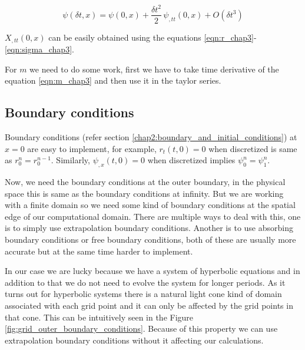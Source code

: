 \begin{equation*}
    \psi(\delta t,x) = \psi(0,x) + \frac{\delta t^2}{2} \, \psi_{,tt}(0,x) + O(\delta t^3)
\end{equation*}

$X_{,tt}(0,x)$ can be easily obtained using the equations \ref{eqn:r_chap3}-\ref{eqn:sigma_chap3}.


For $m$ we need to do some work, first we have to take time derivative of the equation \ref{eqn:m_chap3} and then use it in the taylor series.


\subsection{Boundary conditions}
\label{chap3:boundary_conditinos}

Boundary conditions (refer section \ref{chap2:boundary_and_initial_conditions}) at $x=0$ are easy to implement, for example, $r_t(t,0) = 0$ when discretized is same as $r^{n}_0 = r^{n-1}_0$. Similarly, $\psi_{,x}(t,0) = 0 $ when discretized implies $\psi^{n}_0 = \psi^{n}_1$.

Now, we need the boundary conditions at the outer boundary, in the physical space this is same as the boundary conditions at infinity. But we are working with a finite domain so we need some kind of boundary conditions at the spatial edge of our computational domain. There are multiple ways to deal with this, one is to simply use extrapolation boundary conditions. Another is to use absorbing boundary conditions or free boundary conditions, both of these are usually more accurate but at the same time harder to implement.

In our case we are lucky because we have a system of hyperbolic equations and in addition to that we do not need to evolve the system for longer periods.
As it turns out for hyperbolic systems there is a natural light cone kind of domain associated with each grid point and it can only be affected by the grid points in that cone.
This can be intuitively seen in the Figure \ref{fig:grid_outer_boundary_conditions}. Because of this property we can use extrapolation boundary conditions without it affecting our calculations.

